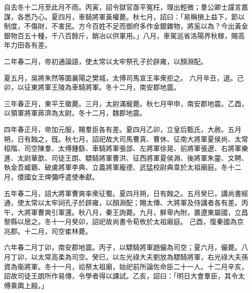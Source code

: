 \begin{pinyinscope}
 
 
 
 自去冬十二月至此月不雨。丙寅，詔令獄官亟平冤枉，理出輕微；羣公卿士讜言嘉謀，各悉乃心。夏四月，車騎將軍黃權薨。秋七月，詔曰：「易稱損上益下，節以制度，不傷財，不害民。方今百姓不足而御府多作金銀雜物，將奚以為？今出黃金銀物百五十種，千八百餘斤，銷冶以供軍用。」八月，車駕巡省洛陽界秋稼，賜高年力田各有差。
 
 
 
 
 二年春二月，帝初通論語，使太常以太牢祭孔子於辟雍，以顏淵配。
 
 
夏五月，吳將朱然等圍襄陽之樊城，太傅司馬宣王率衆拒之。
 六月辛丑，退。己卯，以征東將軍王陵為車騎將軍。冬十二月，南安郡地震。
 
 
 
 
 三年春正月，東平王徽薨。三月，太尉滿寵薨。秋七月甲申，南安郡地震。乙酉，以領軍將軍蔣濟為太尉。冬十二月，魏郡地震。
 
 
 
 
 四年春正月，帝加元服，賜羣臣各有差。夏四月乙卯，立皇后甄氏，大赦。五月朔，日有蝕之，旣。秋七月，詔祀故大司馬曹真、曹休、征南大將軍夏侯尚、太常桓階、司空陳羣、太傅鍾繇、車騎將軍張郃、左將軍徐晃、前將軍張遼、右將軍樂進、太尉華歆、司徒王朗、驃騎將軍曹洪、征西將軍夏侯淵、後將軍朱靈、文聘、執金吾臧霸、破虜將軍李典、立義將軍龐德、武猛校尉典韋於太祖廟庭。冬十二月，倭國女王俾彌呼遣使奉獻。
 
 
五年春二月，詔大將軍曹爽率衆征蜀。夏四月朔，日有蝕之。五月癸巳，講尚書經通，使太常以太牢祠孔子於辟雍，以顏淵配；賜太傳、大將軍及侍講者各有差。丙午，大將軍曹爽引軍還。秋八月，秦王詢薨。九月，鮮卑內附，置遼東屬國，立昌黎縣以居之。冬十一月癸卯，詔祀故尚書令荀攸於太祖廟庭。
 己酉，復秦國為京兆郡。十二月，司空崔林薨。
 
 
 
 
 六年春二月丁卯，南安郡地震。丙子，以驃騎將軍趙儼為司空；夏六月，儼薨。八月丁卯，以太常高柔為司空。癸巳，以左光祿大夫劉放為驃騎將軍，右光祿大夫孫資為衞將軍。冬十一月，祫祭太祖廟，始祀前所論佐命臣二十一人。十二月辛亥，詔故司徒王朗所作易傳，令學者得以課試。乙亥，詔曰：「明日大會羣臣，其令太傅乘輿上殿。」
 

\end{pinyinscope}
